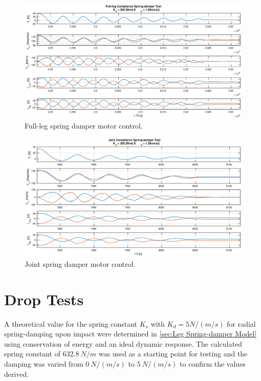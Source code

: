 \begin{figure}
\centering
\includegraphics[width=1\textwidth]{images/experiments/full-leg-spring-damper-control-output.eps} 
\caption{Full-leg spring damper motor control.}
\label{fig:full-leg-spring-damper-motor-control}
\end{figure}

\begin{figure}
\centering
\includegraphics[width=1\textwidth]{images/experiments/joint-spring-damper-control-output.eps} 
\caption{Joint spring damper motor control.}
\label{fig:joint-spring-damper-motor-control}
\end{figure}

\section{Drop Tests}

A theoretical value for the spring constant $K_s$ with $K_d = 5 N/(m/s)$ for radial spring-damping upon impact were determined in \cref{sec:Leg Spring-damper Model} using conservation of energy and an ideal dynamic response. The calculated spring constant of $632.8\ N/m$ was used as a starting point for testing and the damping was varied from $0\ N/(m/s)$ to $5\ N/(m/s)$ to confirm the values derived.

